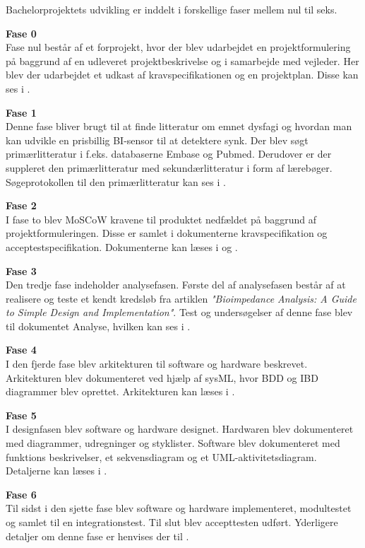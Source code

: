 Bachelorprojektets udvikling  er inddelt i forskellige faser mellem nul til seks.

\textbf{Fase 0}\\
Fase nul består af et forprojekt, hvor der blev udarbejdet en projektformulering på baggrund af en udleveret projektbeskrivelse og i samarbejde med vejleder. Her blev der udarbejdet et udkast af kravspecifikationen og en projektplan. Disse kan ses i .

\textbf{Fase 1}\\
Denne fase bliver brugt til at finde litteratur om emnet dysfagi og hvordan man kan udvikle en prisbillig BI-sensor til at detektere synk. Der blev søgt primærlitteratur i f.eks. databaserne Embase og Pubmed. Derudover er der suppleret den primærlitteratur med sekundærlitteratur i form af lærebøger. Søgeprotokollen til den primærlitteratur kan ses i .

\textbf{Fase 2}\\
I fase to blev MoSCoW kravene til produktet nedfældet på baggrund af projektformuleringen. Disse er samlet i dokumenterne kravspecifikation og acceptestspecifikation. Dokumenterne kan læses i  og .

\textbf{Fase 3}\\
Den tredje fase indeholder analysefasen. Første del af analysefasen består af at realisere og teste et kendt kredsløb fra artiklen \textit{"Bioimpedance Analysis: A Guide to Simple Design and Implementation"}. Test og undersøgelser af denne fase blev til dokumentet Analyse, hvilken kan ses i .

\textbf{Fase 4}\\
I den fjerde fase blev arkitekturen til software og hardware beskrevet. Arkitekturen blev dokumenteret ved hjælp af sysML, hvor BDD og IBD diagrammer blev oprettet. Arkitekturen kan læses i .

\textbf{Fase 5}\\
I designfasen blev software og hardware designet. Hardwaren blev dokumenteret med diagrammer, udregninger og styklister. Software blev dokumenteret med funktions beskrivelser, et sekvensdiagram og et UML-aktivitetsdiagram. Detaljerne kan læses i .

\textbf{Fase 6}\\
Til sidst i den sjette fase blev software og hardware implementeret, modultestet og samlet til en integrationstest. Til slut blev accepttesten udført. Yderligere detaljer om denne fase er henvises der til .

